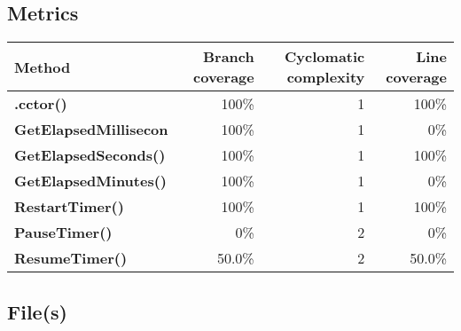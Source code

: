 \documentclass[a4paper,landscape,10pt]{article}
\begin{document}
\subsection{Metrics}
\begin{longtable}[l]{|l|r|r|r|}
\hline
\textbf{Method} & \textbf{Branch coverage} & \textbf{Cyclomatic complexity} & \textbf{Line coverage}\\
\hline
\textbf{.cctor()} & 100\% & 1 & 100\%\\
\hline
\textbf{GetElapsedMillisecon} & 100\% & 1 & 0\%\\
\hline
\textbf{GetElapsedSeconds()} & 100\% & 1 & 100\%\\
\hline
\textbf{GetElapsedMinutes()} & 100\% & 1 & 0\%\\
\hline
\textbf{RestartTimer()} & 100\% & 1 & 100\%\\
\hline
\textbf{PauseTimer()} & 0\% & 2 & 0\%\\
\hline
\textbf{ResumeTimer()} & 50.0\% & 2 & 50.0\%\\
\hline
\end{longtable}
\subsection{File(s)}
\end{document}
